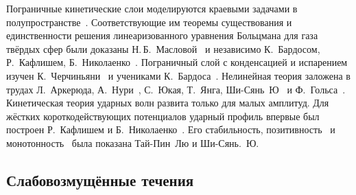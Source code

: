 Пограничные кинетические слои моделируются краевыми задачами в полупространстве~\cite{Grad1969}.
Соответствующие им теоремы существования и единственности решения линеаризованного уравнения Больцмана для газа твёрдых сфер
были доказаны Н.\,Б.~Масловой~\cite{Maslova1982} и независимо К.~Бардосом, Р.~Кафлишем, Б.~Николаенко~\cite{Bardos1986}.
Пограничный слой с конденсацией и испарением изучен К.~Черчиньяни~\cite{Cercignani1986}
и учениками К.~Бардоса~\cite{Coron1988}.
Нелинейная теория заложена в трудах Л.~Аркерюда, А.~Нури~\cite{Arkeryd2000},
С.~Юкая, Т.~Янга, Ши-Сянь~Ю~\cite{Ukai2003} и Ф.~Гольса~\cite{Golse2008}.
Кинетическая теория ударных волн развита только для малых амплитуд.
Для жёстких короткодействующих потенциалов ударный профиль впервые был построен Р.~Кафлишем и Б.~Николаенко~\cite{Caflisch1982}.
Его стабильность, позитивность~\cite{Liu2004} и монотонность~\cite{Liu2013} была показана Тай-Пин~Лю и Ши-Сянь.~Ю.
\subsection{Слабовозмущённые течения}

